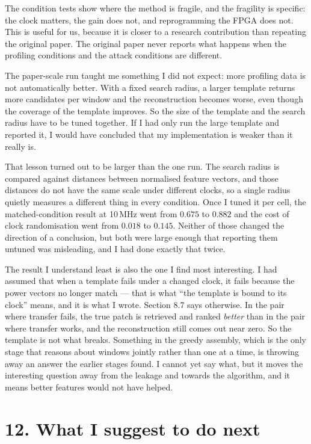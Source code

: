 \documentclass[11pt,a4paper]{article}
\begin{document}
The condition tests show where the method is fragile, and the fragility is specific:
the clock matters, the gain does not, and reprogramming the FPGA does not. This is
useful for us, because it is closer to a research contribution than repeating the
original paper. The original paper never reports what happens when the profiling
conditions and the attack conditions are different.

The paper-scale run taught me something I did not expect: more profiling data is not
automatically better. With a fixed search radius, a larger template returns more
candidates per window and the reconstruction becomes worse, even though the coverage of
the template improves. So the size of the template and the search radius have to be
tuned together. If I had only run the large template and reported it, I would have
concluded that my implementation is weaker than it really is.

That lesson turned out to be larger than the one run. The search radius is compared
against distances between normalised feature vectors, and those distances do not have the
same scale under different clocks, so a single radius quietly measures a different thing
in every condition. Once I tuned it per cell, the matched-condition result at 10\,MHz went
from $0.675$ to $0.882$ and the cost of clock randomisation went from $0.018$ to $0.145$.
Neither of those changed the direction of a conclusion, but both were large enough that
reporting them untuned was misleading, and I had done exactly that twice.

The result I understand least is also the one I find most interesting. I had assumed that
when a template fails under a changed clock, it fails because the power vectors no longer
match --- that is what ``the template is bound to its clock'' means, and it is what I wrote.
Section 8.7 says otherwise. In the pair where transfer fails, the true patch is retrieved
and ranked \emph{better} than in the pair where transfer works, and the reconstruction
still comes out near zero. So the template is not what breaks. Something in the greedy
assembly, which is the only stage that reasons about windows jointly rather than one at a
time, is throwing away an answer the earlier stages found. I cannot yet say what, but it
moves the interesting question away from the leakage and towards the algorithm, and it
means better features would not have helped.

\section*{12. What I suggest to do next}
\end{document}
